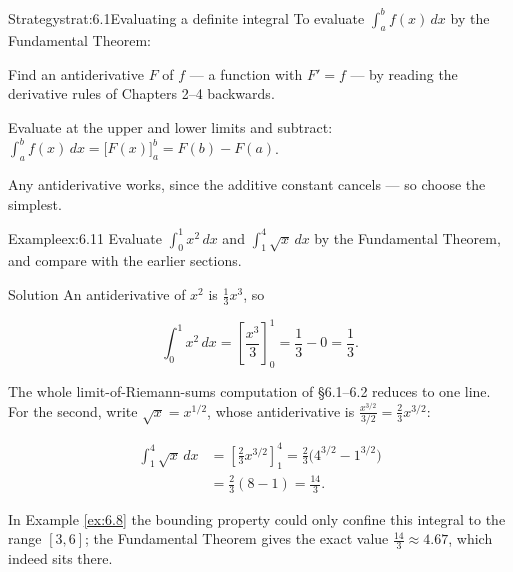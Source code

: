 \documentclass[a4paper,12pt,oneside]{memoir}
\begin{document}
\begin{envstrategy}{Strategy}{strat:6.1}{Evaluating a definite integral}
To evaluate \(\displaystyle\int_{a}^{b} f(x)\,dx\) by the Fundamental Theorem:

\begin{steps}
  \item Find an antiderivative \(F\) of \(f\) — a function with \(F' = f\) — by reading the derivative rules of Chapters 2–4 backwards.
  \item Evaluate at the upper and lower limits and subtract: \(\displaystyle\int_{a}^{b} f(x)\,dx = \bigl[F(x)\bigr]_{a}^{b} = F(b) - F(a)\).
  \item Any antiderivative works, since the additive constant cancels — so choose the simplest.
\end{steps}
\end{envstrategy}
\begin{workedexample}
\begin{envexample}{Example}{ex:6.11}{}
Evaluate \(\displaystyle\int_{0}^{1} x^{2}\,dx\) and \(\displaystyle\int_{1}^{4} \sqrt{x}\,dx\) by the Fundamental Theorem, and compare with the earlier sections.
\end{envexample}
\begin{envsolution}{Solution}{}{}
An antiderivative of \(x^{2}\) is \(\tfrac{1}{3}x^{3}\), so

\[ \int_{0}^{1} x^{2}\,dx = \left[\frac{x^{3}}{3}\right]_{0}^{1} = \frac{1}{3} - 0 = \frac{1}{3}. \]

The whole limit-of-Riemann-sums computation of §6.1–6.2 reduces to one line. For the second, write \(\sqrt{x} = x^{1/2}\), whose antiderivative is \(\tfrac{x^{3/2}}{3/2} = \tfrac{2}{3}x^{3/2}\):

\[ \begin{aligned}
          \int_{1}^{4} \sqrt{x}\,dx &= \left[\frac{2}{3}x^{3/2}\right]_{1}^{4}
                                     = \frac{2}{3}\bigl(4^{3/2} - 1^{3/2}\bigr) \\[2pt]
                                    &= \frac{2}{3}(8 - 1) = \frac{14}{3}.
        \end{aligned} \]

In Example \ref{ex:6.8} the bounding property could only confine this integral to the range \([3, 6]\); the Fundamental Theorem gives the exact value \(\tfrac{14}{3} \approx 4.67\), which indeed sits there. \qedmark
\end{envsolution}
\end{workedexample}
\end{document}

